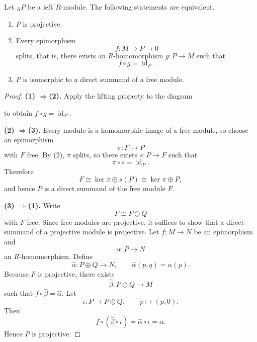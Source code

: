 \begin{theorem}
    Let ${}_R P$ be a left $R$-module. The following statements are equivalent.
    \begin{enumerate}
        \item $P$ is projective.
        \item Every epimorphism
              \[
                  f:M\longrightarrow P\longrightarrow 0
              \]
              splits, that is, there exists an $R$-homomorphism $g:P\to M$ such that
              \[
                  f\circ g=\operatorname{id}_P.
              \]
        \item $P$ is isomorphic to a direct summand of a free module.
    \end{enumerate}
\end{theorem}

\begin{proof}
    \textbf{(1) $\Longrightarrow$(2).}
    Apply the lifting property to the diagram
    \begin{center}
    \end{center}
    to obtain $f\circ g=\operatorname{id}_P$.

    \textbf{(2) $\Longrightarrow$(3).}
    Every module is a homomorphic image of a free module, so choose an epimorphism
    \[
        \pi:F\to P
    \]
    with $F$ free. By (2), $\pi$ splits, so there exists $s:P\to F$ such that
    \[
        \pi\circ s=\operatorname{id}_P.
    \]
    Therefore
    \[
        F\cong \ker\pi \oplus s(P)\cong \ker\pi \oplus P,
    \]
    and hence $P$ is a direct summand of the free module $F$.

    \textbf{(3) $\Longrightarrow$(1).}
    Write
    \[
        F\cong P\oplus Q
    \]
    with $F$ free. Since free modules are projective, it suffices to show that a direct summand
    of a projective module is projective. Let $f:M\to N$ be an epimorphism and
    \[
        \alpha:P\to N
    \]
    an $R$-homomorphism. Define
    \[
        \widehat{\alpha}:P\oplus Q\to N,\qquad \widehat{\alpha}(p,q)=\alpha(p).
    \]
    Because $F$ is projective, there exists
    \[
        \widehat{\beta}:P\oplus Q\to M
    \]
    such that $f\circ \widehat{\beta}=\widehat{\alpha}$. Let
    \[
        \iota:P\to P\oplus Q,\qquad p\mapsto (p,0).
    \]
    Then
    \[
        f\circ (\widehat{\beta}\circ \iota)=\widehat{\alpha}\circ \iota=\alpha.
    \]
    Hence $P$ is projective.
\end{proof}

